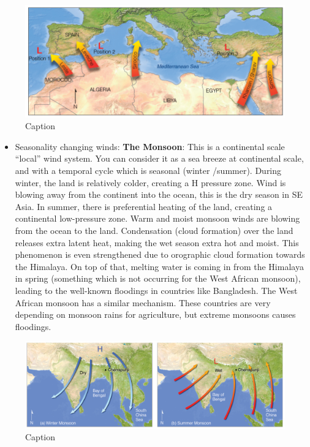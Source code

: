 \documentclass[12pt,oneside]{book}
\providecommand{\tightlist}{%
  \setlength{\itemsep}{0pt}\setlength{\parskip}{0pt}}
\begin{document}
\begin{figure}

{\centering \includegraphics[width=0.6\linewidth]{figures/Figure430} 

}

\caption{Caption}\label{fig:Sahara}
\end{figure}

\begin{itemize}
\tightlist
\item
  Seasonality changing winds: \textbf{The Monsoon}: This is a
  continental scale ``local'' wind system. You can consider it as a sea
  breeze at continental scale, and with a temporal cycle which is
  seasonal (winter /summer). During winter, the land is relatively
  colder, creating a H pressure zone. Wind is blowing away from the
  continent into the ocean, this is the dry season in SE Asia. In
  summer, there is preferential heating of the land, creating a
  continental low-pressure zone. Warm and moist monsoon winds are
  blowing from the ocean to the land. Condensation (cloud formation)
  over the land releases extra latent heat, making the wet season extra
  hot and moist. This phenomenon is even strengthened due to orographic
  cloud formation towards the Himalaya. On top of that, melting water is
  coming in from the Himalaya in spring (something which is not
  occurring for the West African monsoon), leading to the well-known
  floodings in countries like Bangladesh. The West African monsoon has a
  similar mechanism. These countries are very depending on monsoon rains
  for agriculture, but extreme monsoons causes floodings.
\end{itemize}

\begin{figure}

{\centering \includegraphics[width=0.6\linewidth]{figures/Figure431} 

}

\caption{Caption}\label{fig:Monsoon}
\end{figure}
\end{document}
